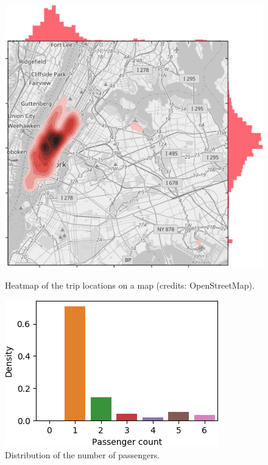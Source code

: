 \documentclass[a4paper]{article}
\begin{document}
\begin{figure}
    \centering
    \begin{minipage}{.45\textwidth}
        \includegraphics[width=\linewidth]{map_kde}
        \caption{Heatmap of the trip locations on a map (credits: OpenStreetMap).}
        \label{heatmap}
    \end{minipage}
    \hspace{0.05\textwidth}
   \begin{minipage}{.45\textwidth}
       \includegraphics[width=\linewidth]{passenger_count}
       \caption{Distribution of the number of passengers.}
       \label{passenger_count}
    \end{minipage}
\end{figure}
\end{document}
